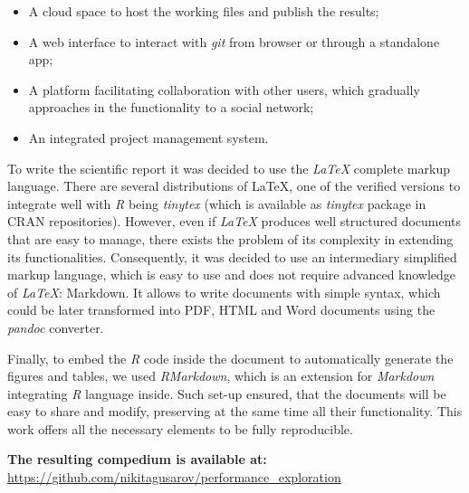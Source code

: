 \documentclass[11pt,]{article}
\providecommand{\tightlist}{%
  \setlength{\itemsep}{0pt}\setlength{\parskip}{0pt}}
\begin{document}
\begin{itemize}
\tightlist
\item
  A cloud space to host the working files and publish the results;
\item
  A web interface to interact with \emph{git} from browser or through a
  standalone app;
\item
  A platform facilitating collaboration with other users, which
  gradually approaches in the functionality to a social network;
\item
  An integrated project management system.
\end{itemize}

To write the scientific report it was decided to use the \emph{LaTeX}
complete markup language. There are several distributions of LaTeX, one
of the verified versions to integrate well with \emph{R} being
\emph{tinytex} (which is available as \emph{tinytex} package in CRAN
repositories). However, even if \emph{LaTeX} produces well structured
documents that are easy to manage, there exists the problem of its
complexity in extending its functionalities. Consequently, it was
decided to use an intermediary simplified markup language, which is easy
to use and does not require advanced knowledge of \emph{LaTeX}:
Markdown. It allows to write documents with simple syntax, which could
be later transformed into PDF, HTML and Word documents using the
\emph{pandoc} converter.

Finally, to embed the \emph{R} code inside the document to automatically
generate the figures and tables, we used \emph{RMarkdown}, which is an
extension for \emph{Markdown} integrating \emph{R} language inside. Such
set-up ensured, that the documents will be easy to share and modify,
preserving at the same time all their functionality. This work offers
all the necessary elements to be fully reproducible.

\textbf{The resulting compedium is available at:}
\url{https://github.com/nikitagusarov/performance_exploration}

\newpage
\end{document}
